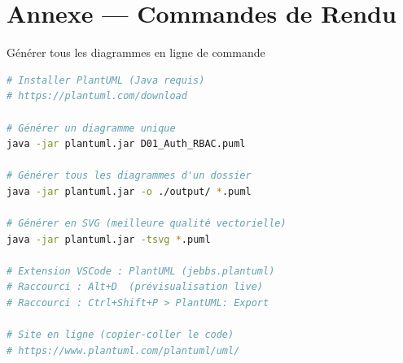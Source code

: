 \documentclass[12pt, a4paper]{report}
\begin{document}
\chapter*{Annexe — Commandes de Rendu}

\begin{noteBox}{Générer tous les diagrammes en ligne de commande}
\begin{lstlisting}[language=bash, numbers=none]
# Installer PlantUML (Java requis)
# https://plantuml.com/download

# Générer un diagramme unique
java -jar plantuml.jar D01_Auth_RBAC.puml

# Générer tous les diagrammes d'un dossier
java -jar plantuml.jar -o ./output/ *.puml

# Générer en SVG (meilleure qualité vectorielle)
java -jar plantuml.jar -tsvg *.puml

# Extension VSCode : PlantUML (jebbs.plantuml)
# Raccourci : Alt+D  (prévisualisation live)
# Raccourci : Ctrl+Shift+P > PlantUML: Export

# Site en ligne (copier-coller le code)
# https://www.plantuml.com/plantuml/uml/
\end{lstlisting}
\end{noteBox}
\end{document}

